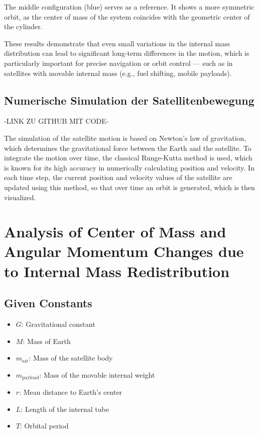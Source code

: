 \documentclass[conference]{IEEEtran}
\begin{document}
The middle configuration (blue) serves as a reference. It shows a more symmetric orbit, as the center of mass of the system coincides with the geometric center of the cylinder.

These results demonstrate that even small variations in the internal mass distribution can lead to significant long-term differences in the motion, which is particularly important for precise navigation or orbit control — such as in satellites with movable internal mass (e.g., fuel shifting, mobile payloads).


\subsection{Numerische Simulation der Satellitenbewegung}
-LINK ZU GITHUB MIT CODE-

The simulation of the satellite motion is based on Newton's law of gravitation, which determines the gravitational force between the Earth and the satellite. To integrate the motion over time, the classical Runge-Kutta method is used, which is known for its high accuracy in numerically calculating position and velocity. In each time step, the current position and velocity values of the satellite are updated using this method, so that over time an orbit is generated, which is then visualized.


\section{Analysis of Center of Mass and Angular Momentum Changes due to Internal Mass Redistribution}

\subsection{Given Constants}

\begin{itemize}
  \item \( G \): Gravitational constant
  \item \( M \): Mass of Earth
  \item \( m_\text{sat} \): Mass of the satellite body
  \item \( m_\text{payload} \): Mass of the movable internal weight
  \item \( r \): Mean distance to Earth's center
  \item \( L \): Length of the internal tube
  \item \( T \): Orbital period
\end{itemize}
\end{document}
